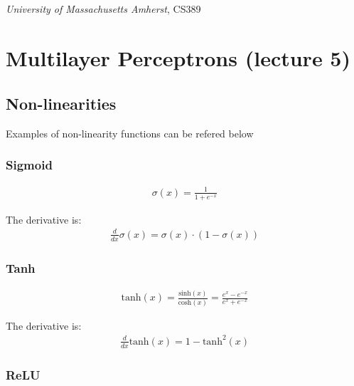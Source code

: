 \documentclass[11pt]{article}
\numberwithin{equation}{section}
\theoremstyle{definition}%
\begin{document}
\noindent
\begin{center}
    \section*{}
    \subsection*{}
    \emph{University of Massachusetts Amherst}, CS389
\end{center}

\section{Multilayer Perceptrons (lecture 5)}

\subsection{Non-linearities}

Examples of non-linearity functions can be refered below

\subsubsection{Sigmoid}

\begin{align}
    \sigma(x) = \frac{1}{1+e^{-x}}
\end{align}

The derivative is:
\begin{align}
    \frac{d}{dx}\sigma(x) = \sigma(x) \cdot (1-\sigma(x))
\end{align}

\subsubsection{Tanh}

\begin{align}
    \text{tanh}(x) = \frac{\text{sinh}(x)}{\text{cosh}(x)} = \frac{e^{x}-e^{-x}}{e^{x}+e^{-x}}
\end{align}

The derivative is:
\begin{align}
    \frac{d}{dx} \text{tanh}(x) = 1 - \text{tanh}^{2}(x)
\end{align}

\subsubsection{ReLU}
\end{document}

